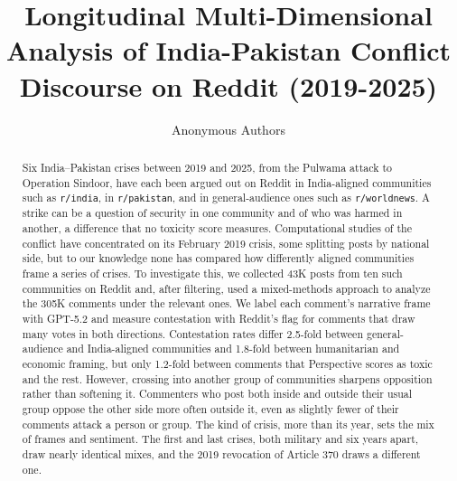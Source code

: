 \documentclass[acmsmall]{acmart}
\begin{document}
\title{Longitudinal Multi-Dimensional Analysis of India-Pakistan Conflict Discourse on Reddit (2019-2025)}


\author{Anonymous Authors}





\begin{abstract}
Six India--Pakistan crises between 2019 and 2025, from the Pulwama attack to Operation Sindoor, have each been argued out on Reddit in India-aligned communities such as \texttt{r/india}, in \texttt{r/pakistan}, and in general-audience ones such as \texttt{r/worldnews}. A strike can be a question of security in one community and of who was harmed in another, a difference that no toxicity score measures. Computational studies of the conflict have concentrated on its February 2019 crisis, some splitting posts by national side, but to our knowledge none has compared how differently aligned communities frame a series of crises. To investigate this, we collected 43K posts from ten such communities on Reddit and, after filtering, used a mixed-methods approach to analyze the 305K comments under the relevant ones. We label each comment's narrative frame with GPT-5.2 and measure contestation with Reddit's flag for comments that draw many votes in both directions. Contestation rates differ 2.5-fold between general-audience and India-aligned communities and 1.8-fold between humanitarian and economic framing, but only 1.2-fold between comments that Perspective scores as toxic and the rest. However, crossing into another group of communities sharpens opposition rather than softening it. Commenters who post both inside and outside their usual group oppose the other side more often outside it, even as slightly fewer of their comments attack a person or group. The kind of crisis, more than its year, sets the mix of frames and sentiment. The first and last crises, both military and six years apart, draw nearly identical mixes, and the 2019 revocation of Article 370 draws a different one.
\end{abstract}
\end{document}
